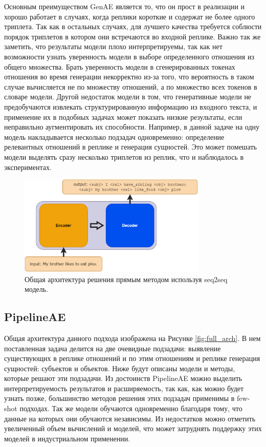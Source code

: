 Основным преимуществом GenAE является то, что он прост в реализации и хорошо работает в случаях, когда реплики короткие и содержат не более одного триплета. Так как в остальных случаях, для лучшего качества требуется соблюсти порядок триплетов в котором они встречаются во входной реплике. Важно так же заметить, что результаты модели плохо интерпретируемы, так как нет возможности узнать уверенность модели в выборе определенного отношения из общего множества. Брать уверенность модели в сгенерированных токенах отношения во время генерации некорректно из-за того, что вероятность в таком случае вычисляется не по множеству отношений, а по множество всех токенов в словаре модели. Другой недостаток модели в том, что генеративные модели не предобучаются извлекать структурированную информацию из входного текста, и применение их в подобных задачах может показать низкие результаты, если неправильно аугментировать их способности. Например, в данной задаче на одну модель накладывается несколько подзадач одновременно: определение релевантных отношений в реплике и генерация сущностей. Это может помешать модели выделять сразу несколько триплетов из реплик, что и наблюдалось в экспериментах.

\begin{figure}[!ht]
    \centering
    \includegraphics[width=0.8\textwidth]{images/mt5_arch.png}
    \caption{Общая архитектура решения прямым методом используя seq2seq модель.}
    \label{fig:mt5_arch}
\end{figure}

\subsection{PipelineAE}
Общая архитектура данного подхода изображена на Рисунке \ref{fig:full_arch}. В нем поставленная задача делится на две очевидные подзадачи: выявление существующих в реплике отношений и по этим отношениям и реплике генерация сущностей: субъектов и объектов. Ниже будут описаны модели и методы, которые решают эти подзадачи. Из достоинств PipelineAE можно выделить интерпретируемость результатов и расширяемость, так как, как можно будет узнать позже, большинство методов решения этих подзадач применимы в few-shot подходах. Так же модели обучаются одновременно благодаря тому, что данные на которых они обучаются независимы. Из недостатков можно отметить увеличенный объем вычислений и моделей, что может затруднять поддержку этих моделей в индустриальном применении.

